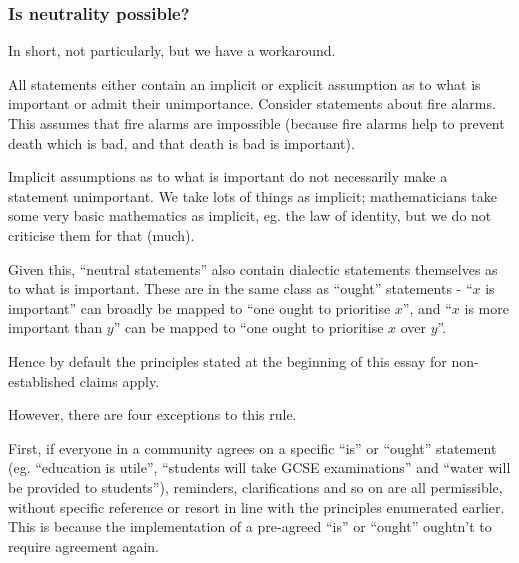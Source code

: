\documentclass[12pt,a4paper]{report}
\begin{document}
\begin{multicols}{2}
\subsubsection{Is neutrality possible?}\label{is-neutrality-possible}

In short, not particularly, but we have a workaround.

All statements either contain an implicit or explicit assumption as to
what is important or admit their unimportance. Consider statements about
fire alarms. This assumes that fire alarms are impossible (because fire
alarms help to prevent death which is bad, and that death is bad is
important).

Implicit assumptions as to what is important do not necessarily make a
statement unimportant. We take lots of things as implicit;
mathematicians take some very basic mathematics as implicit, eg. the law
of identity, but we do not criticise them for that (much).

Given this, ``neutral statements'' also contain dialectic statements
themselves as to what is important. These are in the same class as
``ought'' statements - ``$x$ is important'' can broadly be mapped
to ``one ought to prioritise $x$'', and ``$x$ is more
important than $y$'' can be mapped to ``one ought to prioritise
$x$ over $y$''.

Hence by default the principles stated at the beginning of this essay
for non-established claims apply.

However, there are four exceptions to this rule.

First, if everyone in a community agrees on a specific ``is'' or
``ought'' statement (eg. ``education is utile'', ``students will take
GCSE examinations'' and ``water will be provided to students''),
reminders, clarifications and so on are all permissible, without
specific reference or resort in line with the principles enumerated
earlier. This is because the implementation of a pre-agreed ``is'' or
``ought'' oughtn't to require agreement again.


\end{multicols}
\end{document}
